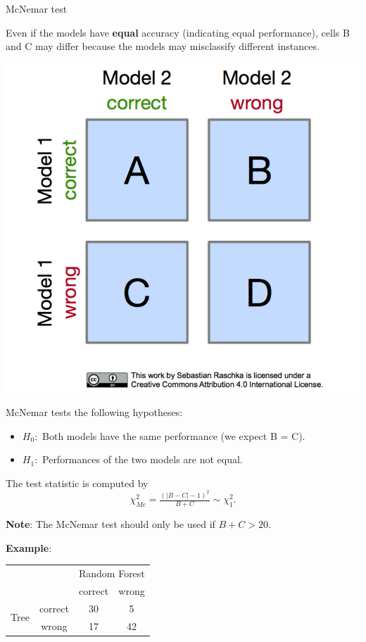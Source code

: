 \begin{vbframe}{McNemar test}
\begin{minipage}[c]{0.625\linewidth}
Even if the models have \textbf{equal} accuracy (indicating equal performance), cells B and C may differ because the models may misclassify different instances.
\end{minipage}
\begin{minipage}[c]{0.365\linewidth}
  \includegraphics{figure_man/mcnemar_1.png}
\end{minipage}

\lz McNemar tests the following hypotheses:
\begin{itemize}
\item $H_0:$ Both models have the same performance (we expect B = C).
\item $H_1:$ Performances of the two models are not equal.
\end{itemize}
The test statistic is computed by
$$\chi^2_{Mc} =  \tfrac{(|B-C| - 1)^2}{B + C} \sim \chi^2_{1}.$$

\textbf{Note}: The McNemar test should only be used if $B + C > 20$.

\framebreak

\textbf{Example}:

\begin{center}
  \begin{tabular}{cc|cc}
      & & \multicolumn{2}{c}{Random Forest} \\
      & & correct & wrong \\
      \hline
      \multirow{2}{*}{Tree} & correct & 30 & 5 \\
      & wrong & 17 & 42 \\
  \end{tabular}
\end{center}


\end{vbframe}
